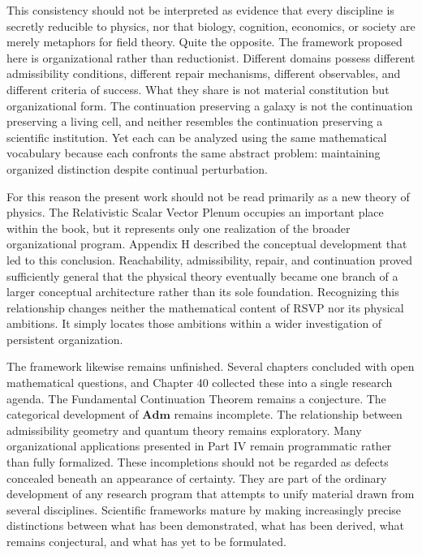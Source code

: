 \documentclass[11pt,oneside]{book}
\numberwithin{equation}{chapter}
\theoremstyle{definition}
\theoremstyle{plain}
\begin{document}
This consistency should not be interpreted as evidence that every
discipline is secretly reducible to physics, nor that biology, cognition,
economics, or society are merely metaphors for field theory. Quite the
opposite. The framework proposed here is organizational rather than
reductionist. Different domains possess different admissibility
conditions, different repair mechanisms, different observables, and
different criteria of success. What they share is not material
constitution but organizational form. The continuation preserving a galaxy
is not the continuation preserving a living cell, and neither resembles
the continuation preserving a scientific institution. Yet each can be
analyzed using the same mathematical vocabulary because each confronts the
same abstract problem: maintaining organized distinction despite continual
perturbation.

For this reason the present work should not be read primarily as a new
theory of physics. The Relativistic Scalar Vector Plenum occupies an
important place within the book, but it represents only one realization of
the broader organizational program. Appendix H described the conceptual
development that led to this conclusion. Reachability, admissibility,
repair, and continuation proved sufficiently general that the physical
theory eventually became one branch of a larger conceptual architecture
rather than its sole foundation. Recognizing this relationship changes
neither the mathematical content of RSVP nor its physical ambitions. It
simply locates those ambitions within a wider investigation of persistent
organization.

The framework likewise remains unfinished. Several chapters concluded with
open mathematical questions, and Chapter 40 collected these into a single
research agenda. The Fundamental Continuation Theorem remains a
conjecture. The categorical development of \(\mathbf{Adm}\) remains
incomplete. The relationship between admissibility geometry and quantum
theory remains exploratory. Many organizational applications presented in
Part IV remain programmatic rather than fully formalized. These
incompletions should not be regarded as defects concealed beneath an
appearance of certainty. They are part of the ordinary development of any
research program that attempts to unify material drawn from several
disciplines. Scientific frameworks mature by making increasingly precise
distinctions between what has been demonstrated, what has been derived,
what remains conjectural, and what has yet to be formulated.
\end{document}
